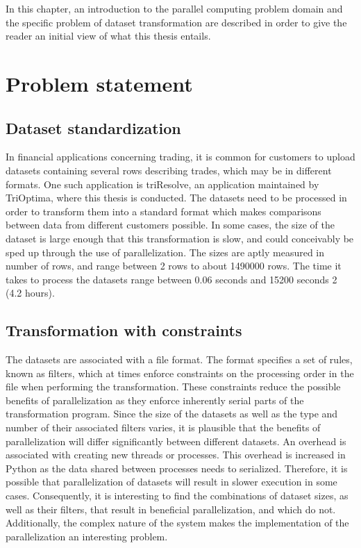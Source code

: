 In this chapter, an introduction to the parallel computing problem domain and the specific problem of dataset transformation are
described in order to give the reader an initial view of what this thesis entails.

\section{Problem statement}
\subsection{Dataset standardization}
In financial applications concerning trading, it is common for customers to upload datasets containing several rows
describing trades, which may be in different formats. One such application is triResolve, an application maintained by
TriOptima, where this thesis is conducted.
The datasets need to be processed in order to transform them into a standard format which makes comparisons between data from different customers possible. 
In some cases, the size of the dataset is large enough that this transformation is slow, and could conceivably be sped up through
the use of parallelization. The sizes are aptly measured in number of rows, and range between 2 rows to about 1490000 rows. The time
it takes to process the datasets range between 0.06 seconds and 15200 seconds 2 (4.2 hours).

\subsection{Transformation with constraints}
The datasets are associated with a file format. The format specifies a set of rules, known as filters, which at times enforce
constraints on the processing order in the file when performing the transformation. These constraints reduce the possible benefits of parallelization as they enforce
inherently serial parts of the transformation program.  Since the size of the datasets as well as the type and number of their
associated filters varies, it is plausible that the benefits of parallelization will differ significantly between different datasets.
An overhead is associated with creating new threads or processes.  This overhead is increased in Python as the data shared between processes needs to serialized.
Therefore, it is possible that parallelization of datasets will result in slower execution in some cases. Consequently, it is
interesting to find the combinations of dataset sizes, as well as their filters, that result in beneficial parallelization, and which do not.
Additionally, the complex nature of the system makes the implementation of the parallelization an interesting problem.

